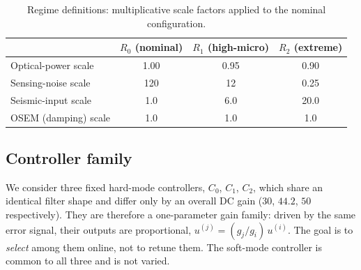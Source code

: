 \documentclass[11pt,a4paper]{article}
\newcommand{\Cz}{C_{0}}
\newcommand{\Co}{C_{1}}
\newcommand{\Ct}{C_{2}}
\begin{document}
\begin{table}[t]
  \centering
  \caption{Regime definitions: multiplicative scale factors applied to the
  nominal configuration.}
  \label{tab:regimes}
  \begin{tabular}{lccc}
    \toprule
     & $R_0$ (nominal) & $R_1$ (high-micro) & $R_2$ (extreme) \\
    \midrule
    Optical-power scale          & 1.00 & 0.95 & 0.90 \\
    Sensing-noise scale          & 120  & 12   & 0.25 \\
    Seismic-input scale          & 1.0  & 6.0  & 20.0 \\
    OSEM (damping) scale         & 1.0  & 1.0  & 1.0  \\
    \bottomrule
  \end{tabular}
\end{table}

\subsection{Controller family}\label{sec:pr-ctrl}
We consider three fixed hard-mode controllers, $\Cz$, $\Co$, $\Ct$, which share
an identical filter shape and differ only by an overall DC gain
($30$, $44.2$, $50$ respectively). They are therefore a one-parameter gain
family: driven by the same error signal, their outputs are proportional,
$u^{(j)} = (g_j/g_i)\,u^{(i)}$. The goal is to \emph{select} among them online,
not to retune them. The soft-mode controller is common to all three and is not
varied.
\end{document}
